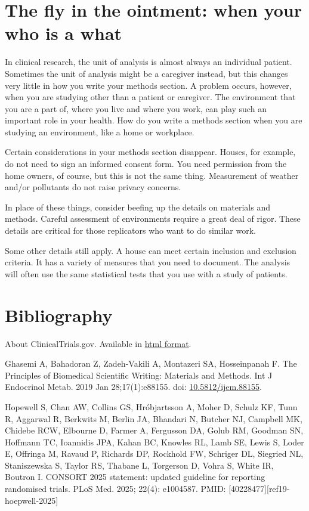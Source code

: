 \documentclass[
  letterpaper,
  DIV=11,
  numbers=noendperiod]{scrreprt}
\begin{document}
\section{The fly in the ointment: when your who is a
what}\label{the-fly-in-the-ointment-when-your-who-is-a-what}

In clinical research, the unit of analysis is almost always an
individual patient. Sometimes the unit of analysis might be a caregiver
instead, but this changes very little in how you write your methods
section. A problem occurs, however, when you are studying other than a
patient or caregiver. The environment that you are a part of, where you
live and where you work, can play such an important role in your health.
How do you write a methods section when you are studying an environment,
like a home or workplace.

Certain considerations in your methods section disappear. Houses, for
example, do not need to sign an informed consent form. You need
permission from the home owners, of course, but this is not the same
thing. Measurement of weather and/or pollutants do not raise privacy
concerns.

In place of these things, consider beefing up the details on materials
and methods. Careful assessment of environments require a great deal of
rigor. These details are critical for those replicators who want to do
similar work.

Some other details still apply. A house can meet certain inclusion and
exclusion criteria. It has a variety of measures that you need to
document. The analysis will often use the same statistical tests that
you use with a study of patients.

\section{Bibliography}\label{bibliography-6}

About ClinicalTrials.gov. Available in
\href{https://clinicaltrials.gov/about-site/about-ctg}{html format}.

Ghasemi A, Bahadoran Z, Zadeh-Vakili A, Montazeri SA, Hosseinpanah F.
The Principles of Biomedical Scientific Writing: Materials and Methods.
Int J Endocrinol Metab. 2019 Jan 28;17(1):e88155. doi:
\href{https://doi.org/10.5812/ijem.88155}{10.5812/ijem.88155}.

Hopewell S, Chan AW, Collins GS, Hróbjartsson A, Moher D, Schulz KF,
Tunn R, Aggarwal R, Berkwits M, Berlin JA, Bhandari N, Butcher NJ,
Campbell MK, Chidebe RCW, Elbourne D, Farmer A, Fergusson DA, Golub RM,
Goodman SN, Hoffmann TC, Ioannidis JPA, Kahan BC, Knowles RL, Lamb SE,
Lewis S, Loder E, Offringa M, Ravaud P, Richards DP, Rockhold FW,
Schriger DL, Siegried NL, Staniszewska S, Taylor RS, Thabane L,
Torgerson D, Vohra S, White IR, Boutron I. CONSORT 2025 statement:
updated guideline for reporting randomised trials. PLoS Med. 2025;
22(4): e1004587. PMID: {[}40228477{]}{[}ref19-hoepwell-2025{]}
\end{document}
